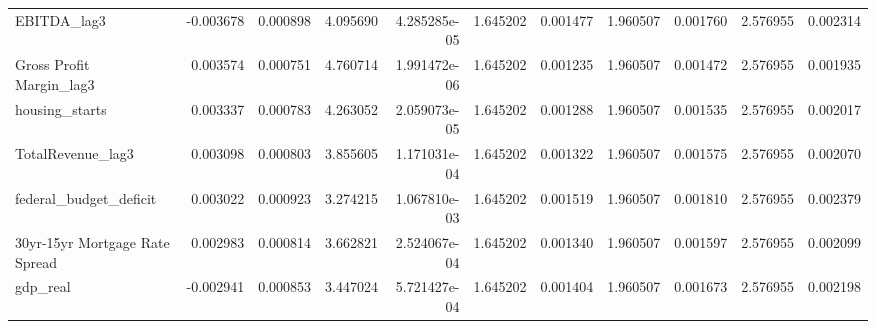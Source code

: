 \documentclass[12pt,a4paper,english]{article}
\begin{document}
{{\begin{tabular}{@{}lrrrrrrrrrr@{}}
			EBITDA\_lag3                   & -0.003678                & 0.000898                    & 4.095690                  & 4.285285e-05                             & 1.645202                      & 0.001477                      & 1.960507                     & 0.001760                     & 2.576955                     & 0.002314                     \\
			Gross Profit Margin\_lag3      & 0.003574                 & 0.000751                    & 4.760714                  & 1.991472e-06                             & 1.645202                      & 0.001235                      & 1.960507                     & 0.001472                     & 2.576955                     & 0.001935                     \\
			housing\_starts                & 0.003337                 & 0.000783                    & 4.263052                  & 2.059073e-05                             & 1.645202                      & 0.001288                      & 1.960507                     & 0.001535                     & 2.576955                     & 0.002017                     \\
			TotalRevenue\_lag3             & 0.003098                 & 0.000803                    & 3.855605                  & 1.171031e-04                             & 1.645202                      & 0.001322                      & 1.960507                     & 0.001575                     & 2.576955                     & 0.002070                     \\
			federal\_budget\_deficit       & 0.003022                 & 0.000923                    & 3.274215                  & 1.067810e-03                             & 1.645202                      & 0.001519                      & 1.960507                     & 0.001810                     & 2.576955                     & 0.002379                     \\
			30yr-15yr Mortgage Rate Spread & 0.002983                 & 0.000814                    & 3.662821                  & 2.524067e-04                             & 1.645202                      & 0.001340                      & 1.960507                     & 0.001597                     & 2.576955                     & 0.002099                     \\
			gdp\_real                      & -0.002941                & 0.000853                    & 3.447024                  & 5.721427e-04                             & 1.645202                      & 0.001404                      & 1.960507                     & 0.001673                     & 2.576955                     & 0.002198                     \\

\end{tabular}}}
\end{document}
